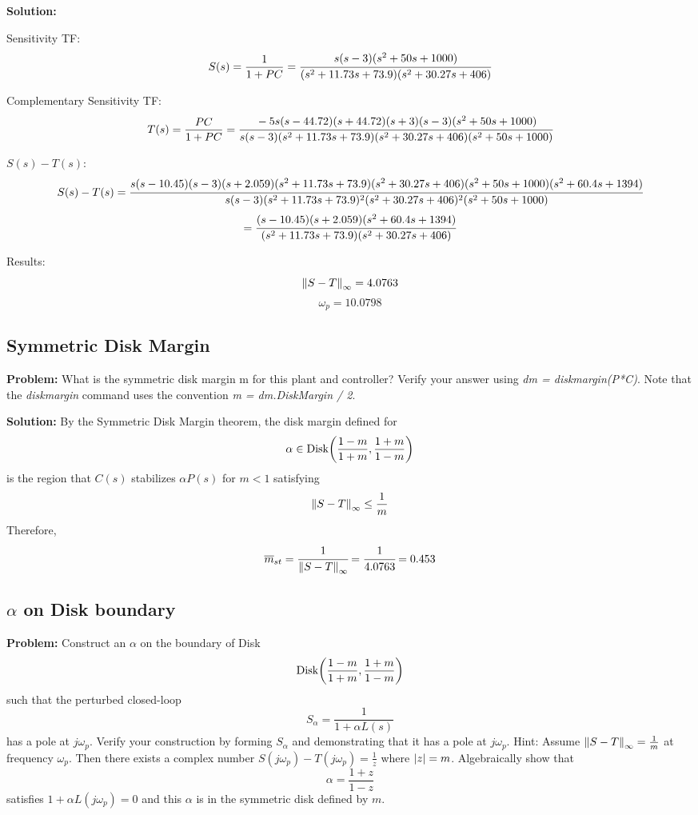 \documentclass[letter]{article}
\numberwithin{equation}{section}
\begin{document}
\textbf{Solution:} 

Sensitivity TF: \[
	S(s) = \frac{1}{1+PC}
		= \cfrac{
			s (s-3) (s^2 + 50s + 1000)
		}{
			(s^2 + 11.73s + 73.9) (s^2 + 30.27s + 406)
		}
\]

Complementary Sensitivity TF: \[
	T(s) = \frac{PC}{1+PC}
		= \cfrac{
			-5 s (s-44.72) (s+44.72) (s+3) (s-3) (s^2 + 50s + 1000)
		}{
			s (s-3) (s^2 + 11.73s + 73.9) (s^2 + 30.27s + 406) (s^2 + 50s + 1000)
		}
\]

$S(s)-T(s)$: \[
	S(s)-T(s) = \cfrac{
		s (s-10.45) (s-3) (s+2.059) (s^2 + 11.73s + 73.9) (s^2 + 30.27s + 406) (s^2 + 50s + 1000) (s^2 + 60.4s + 1394)
		}{
			s (s-3) (s^2 + 11.73s + 73.9)^2 (s^2 + 30.27s + 406)^2 (s^2 + 50s + 1000)
		}
\]\[
	= \cfrac{
		(s-10.45) (s+2.059) (s^2 + 60.4s + 1394)
		}{
			(s^2 + 11.73s + 73.9) (s^2 + 30.27s + 406)
		}
\]

Results:\[
	\norm{S-T}_\infty = 4.0763
\]\[
	\omega_{p} = 10.0798
\]

\subsection{Symmetric Disk Margin}
\textbf{Problem:}
What is the symmetric disk margin m for this plant and controller? 
Verify your answer using \emph{dm = diskmargin(P*C)}. 
Note that the \emph{diskmargin} command uses the convention \emph{m = dm.DiskMargin / 2}.

\textbf{Solution:}
By the Symmetric Disk Margin theorem, the disk margin defined for \[
	\alpha \in \text{Disk}\qty(\frac{1-m}{1+m},\frac{1+m}{1-m})
\] is the region that $C(s)$ stabilizes $\alpha P(s)$ for $m < 1$ satisfying\[
	\norm{S-T}_\infty \leq \frac{1}{m}
\] Therefore, \[
	\overline{m}_{st} = \cfrac{1}{\norm{S-T}_\infty} 
	= \cfrac{1}{4.0763} = 0.453
\]

\subsection{$\alpha$ on Disk boundary}
\textbf{Problem:}
Construct an $\alpha$ on the boundary of Disk \[
	\text{Disk}\qty(\frac{1-m}{1+m},\frac{1+m}{1-m})
\] such that the perturbed closed-loop \[
	S_\alpha = \frac{1}{1 + \alpha L(s)}
\] has a pole at $j\omega_p$. 
Verify your construction by forming $S_\alpha$ and demonstrating that it has a pole at $j \omega_p$.
Hint: Assume $\norm{S-T}_\infty = \frac{1}{m}$ at frequency $\omega_p$. 
Then there exists a complex number $S(j\omega_p) - T(j\omega_p) = \frac{1}{z}$ where $\abs{z} = m$.
Algebraically show that \[
	\alpha = \frac{1 + z}{1-z}
\] satisfies $1 + \alpha L(j\omega_p) = 0$ and this $\alpha$ is in the symmetric disk defined by $m$.
\end{document}
